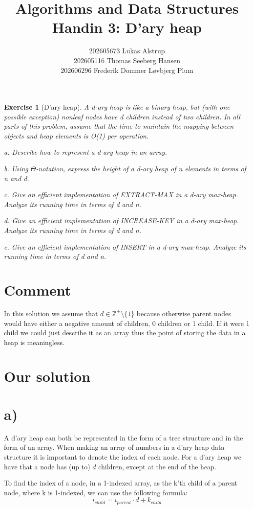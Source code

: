 \documentclass{article}
\title{Algorithms and Data Structures \\
  Handin 3: D'ary heap}
\author{
    202605673 Lukas Alstrup \\
    202605116 Thomas Seeberg Hansen \\
    202606296 Frederik Dommer Løvbjerg Plum
}
\newtheorem*{exercise}{Exercise}
\begin{document}
\maketitle
\begin{exercise}[D'ary heap]
	A d-ary heap is like a binary heap, but (with one possible exception)
	nonleaf nodes have d children instead of two children. In all parts of
	this problem, assume that the time to maintain the mapping between
	objects and heap elements is O(1) per operation.

	a. Describe how to represent a d-ary heap in an array.

	b. Using $\Theta$-notation, express the height of a d-ary heap of n elements in
	terms of n and d.

	c. Give an efficient implementation of EXTRACT-MAX in a d-ary
	max-heap. Analyze its running time in terms of d and n.

	d. Give an efficient implementation of INCREASE-KEY in a d-ary
	max-heap. Analyze its running time in terms of d and n.

	e. Give an efficient implementation of INSERT in a d-ary max-heap.
	Analyze its running time in terms of d and n.

\end{exercise}


\section*{Comment}
In this solution we assume that $d \in \mathbb{Z}^+ \setminus \{1\}$ because otherwise parent nodes would have either a negative amount of children, 0 children or 1 child. If it were 1 child we could just describe it as an array thus the point of storing the data in a heap is meaningless.
\section*{Our solution}


\section*{a)}
A d'ary heap can both be represented in the form of a tree structure and in the form of an array. When making an array of numbers in a d'ary heap data structure it is important to denote the index of each node. For a d'ary heap we have that a node has (up to) $d$ children, except at the end of the heap.

To find the index of a node, in a 1-indexed array, as the k'th child of a parent node, where k is 1-indexed, we can use the following formula:
$$i_{child} = i_{parent} \cdot d + k_{child}$$
\end{document}
